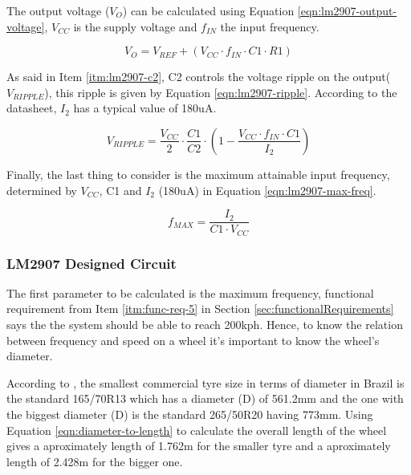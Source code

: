 			The output voltage ($V_{O}$) can be calculated using Equation \ref{eqn:lm2907-output-voltage}, $V_{CC}$ is the supply voltage and $f_{IN}$ the input frequency.

			\begin{equation}\label{eqn:lm2907-output-voltage}
				V_{O}=V_{REF} + \left( V_{CC} \cdot f_{IN} \cdot C1 \cdot R1 \right)
			\end{equation}

			As said in Item \ref{itm:lm2907-c2}, C2 controls the voltage ripple on the output($V_{RIPPLE}$), this ripple is given by Equation \ref{eqn:lm2907-ripple}. According to the datasheet, $I_{2}$ has a typical value of 180uA.

			\begin{equation}\label{eqn:lm2907-ripple}
				V_{RIPPLE}=\frac{V_{CC}}{2} \cdot \frac{C1}{C2} \cdot \left( 1 - \frac{V_{CC} \cdot f_{IN} \cdot C1}{I_{2}} \right)
			\end{equation}

			Finally, the last thing to consider is the maximum attainable input frequency, determined by $V_{CC}$, C1 and $I_{2}$ (180uA) in Equation \ref{eqn:lm2907-max-freq}.

			\begin{equation}\label{eqn:lm2907-max-freq}
				f_{MAX} = \frac{I_{2}}{C1 \cdot V_{CC}}
			\end{equation}

		\subsubsection{LM2907 Designed Circuit}\label{sssec:lm2907-designed-circuit}

			The first parameter to be calculated is the maximum frequency, functional requirement from Item \ref{itm:func-req-5} in Section \ref{sec:functionalRequirements} says the the system should be able to reach 200kph. Hence, to know the relation between frequency and speed on a wheel it's important to know the wheel's diameter.
			\par
			According to \cite{pneus-facil-todas-as-medidas-de-pneu}, the smallest commercial tyre size in terms of diameter in Brazil is the standard 165/70R13 which has a diameter (D) of 561.2mm and the one with the biggest diameter (D) is the standard 265/50R20 having 773mm. Using Equation \ref{eqn:diameter-to-length} to calculate the overall length of the wheel gives a aproximately length of 1.762m for the smaller tyre and a aproximately length of 2.428m for the bigger one.

